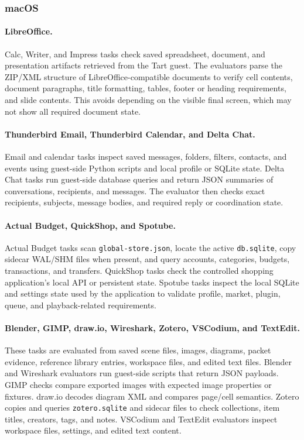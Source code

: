 \subsubsection{macOS}
\paragraph{LibreOffice.}
Calc, Writer, and Impress tasks check saved spreadsheet, document, and presentation artifacts retrieved from the Tart guest. The evaluators parse the ZIP/XML structure of LibreOffice-compatible documents to verify cell contents, document paragraphs, title formatting, tables, footer or heading requirements, and slide contents. This avoids depending on the visible final screen, which may not show all required document state.

\paragraph{Thunderbird Email, Thunderbird Calendar, and Delta Chat.}
Email and calendar tasks inspect saved messages, folders, filters, contacts, and events using guest-side Python scripts and local profile or SQLite state. Delta Chat tasks run guest-side database queries and return JSON summaries of conversations, recipients, and messages. The evaluator then checks exact recipients, subjects, message bodies, and required reply or coordination state.

\paragraph{Actual Budget, QuickShop, and Spotube.}
Actual Budget tasks scan \texttt{global-store.json}, locate the active \texttt{db.sqlite}, copy sidecar WAL/SHM files when present, and query accounts, categories, budgets, transactions, and transfers. QuickShop tasks check the controlled shopping application's local API or persistent state. Spotube tasks inspect the local SQLite and settings state used by the application to validate profile, market, plugin, queue, and playback-related requirements.

\paragraph{Blender, GIMP, draw.io, Wireshark, Zotero, VSCodium, and TextEdit.}
These tasks are evaluated from saved scene files, images, diagrams, packet evidence, reference library entries, workspace files, and edited text files. Blender and Wireshark evaluators run guest-side scripts that return JSON payloads. GIMP checks compare exported images with expected image properties or fixtures. draw.io decodes diagram XML and compares page/cell semantics. Zotero copies and queries \texttt{zotero.sqlite} and sidecar files to check collections, item titles, creators, tags, and notes. VSCodium and TextEdit evaluators inspect workspace files, settings, and edited text content.

